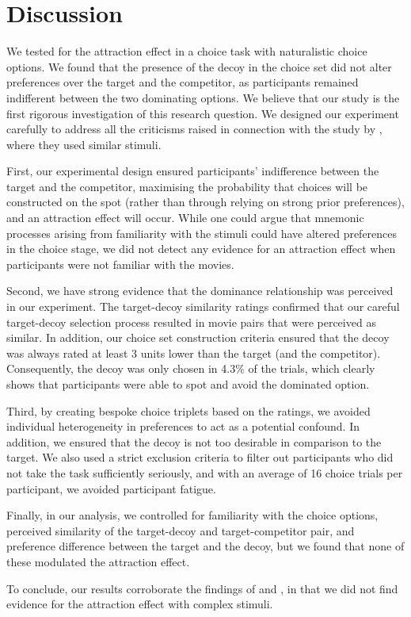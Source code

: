 \documentclass[12pt, a4paper]{article}
\begin{document}
\section*{Discussion}

We tested for the attraction effect in a choice task with naturalistic choice options. We found that the presence of the decoy in the choice set did not alter preferences over the target and the competitor, as participants remained indifferent between the two dominating options. We believe that our study is the first rigorous investigation of this research question. We designed our experiment carefully to address all the criticisms raised in connection with the study by \citeauthor{Frederick2014}, where they used similar stimuli.

First, our experimental design ensured participants' indifference between the target and the competitor, maximising the probability that choices will be constructed on the spot (rather than through relying on strong prior preferences), and an attraction effect will occur. While one could argue that mnemonic processes arising from familiarity with the stimuli could have altered preferences in the choice stage, we did not detect any evidence for an attraction effect when participants were not familiar with the movies.

Second, we have strong evidence that the dominance relationship was perceived in our experiment. The target-decoy similarity ratings confirmed that our careful target-decoy selection process resulted in movie pairs that were perceived as similar. In addition, our choice set construction criteria ensured that the decoy was always rated at least 3 units lower than the target (and the competitor). Consequently, the decoy was only chosen in 4.3\% of the trials, which clearly shows that participants were able to spot and avoid the dominated option.

Third, by creating bespoke choice triplets based on the ratings, we avoided individual heterogeneity in preferences to act as a potential confound. In addition, we ensured that the decoy is not too desirable in comparison to the target. We also used a strict exclusion criteria to filter out participants who did not take the task sufficiently seriously, and with an average of 16 choice trials per participant, we avoided participant fatigue.


Finally, in our analysis, we controlled for familiarity with the choice options, perceived similarity of the target-decoy and target-competitor pair, and preference difference between the target and the decoy, but we found that none of these modulated the attraction effect.


To conclude, our results corroborate the findings of \citeauthor{Frederick2014} and \citeauthor{Yang2014}, in that we did not find evidence for the attraction effect with complex stimuli.





\newpage



\newpage

\theendnotes

\newpage
\end{document}
